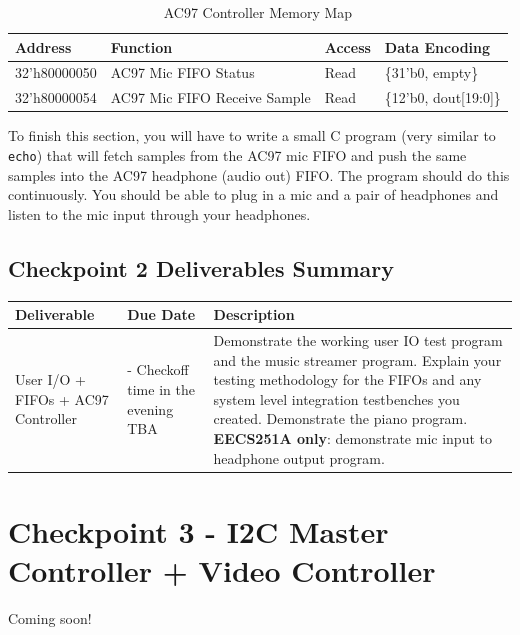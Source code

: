 \documentclass[11pt]{article}
\begin{document}
\begin{table}[hbt]
	\begin{center}
		\caption{AC97 Controller Memory Map}
		\begin{tabular}{l l l l}
			\toprule
			\textbf{Address} & \textbf{Function} & \textbf{Access} & \textbf{Data Encoding}\\
			\midrule
			32'h80000050 & AC97 Mic FIFO Status & Read & \{31'b0, empty\} \\
			32'h80000054 & AC97 Mic FIFO Receive Sample & Read & \{12'b0, dout[19:0]\} \\
			\bottomrule
		\end{tabular}
	\end{center}
\end{table}

To finish this section, you will have to write a small C program (very similar to \verb|echo|) that will fetch samples from the AC97 mic FIFO and push the same samples into the AC97 headphone (audio out) FIFO. The program should do this continuously. You should be able to plug in a mic and a pair of headphones and listen to the mic input through your headphones.

\subsection{Checkpoint 2 Deliverables Summary}

\begin{center}
	\begin{tabular}{m{30mm} m{35mm} m{70mm}}
		\toprule
		\textbf{Deliverable} & \textbf{Due Date} & \textbf{Description} \\
		\midrule
		User I/O + FIFOs + AC97 Controller & \audioDueDate - Checkoff time in the evening TBA & Demonstrate the working user IO test program and the music streamer program. Explain your testing methodology for the FIFOs and any system level integration testbenches you created. Demonstrate the piano program. \textbf{EECS251A only}: demonstrate mic input to headphone output program. \\
		\bottomrule
	\end{tabular}
\end{center}

\pagebreak

\section{Checkpoint 3 - I2C Master Controller + Video Controller}
Coming soon!
\end{document}
